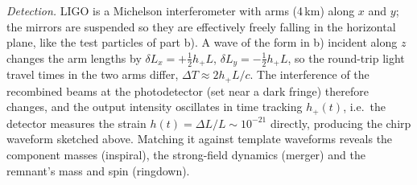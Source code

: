\documentclass[11pt]{article}
\begin{document}
\emph{Detection.} LIGO is a Michelson interferometer with arms (4\,km) along $x$ and $y$; the mirrors are suspended so they are effectively freely falling in the horizontal plane, like the test particles of part b). A wave of the form in b) incident along $z$ changes the arm lengths by $\delta L_x=+\tfrac12h_+L$, $\delta L_y=-\tfrac12h_+L$, so the round-trip light travel times in the two arms differ, $\Delta T\approx 2h_+L/c$. The interference of the recombined beams at the photodetector (set near a dark fringe) therefore changes, and the output intensity oscillates in time tracking $h_+(t)$, i.e.\ the detector measures the strain $h(t)=\Delta L/L\sim10^{-21}$ directly, producing the chirp waveform sketched above. Matching it against template waveforms reveals the component masses (inspiral), the strong-field dynamics (merger) and the remnant's mass and spin (ringdown).
\end{document}
